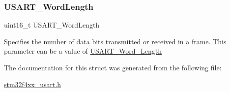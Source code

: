 \subsubsection{\texorpdfstring{U\+S\+A\+R\+T\+\_\+\+Word\+Length}{USART\_WordLength}}
{\footnotesize\ttfamily uint16\+\_\+t U\+S\+A\+R\+T\+\_\+\+Word\+Length}

Specifies the number of data bits transmitted or received in a frame. This parameter can be a value of \mbox{\hyperlink{group___u_s_a_r_t___word___length}{U\+S\+A\+R\+T\+\_\+\+Word\+\_\+\+Length}} 

The documentation for this struct was generated from the following file\+:\begin{DoxyCompactItemize}
\item 
\mbox{\hyperlink{stm32f4xx__usart_8h}{stm32f4xx\+\_\+usart.\+h}}\end{DoxyCompactItemize}
